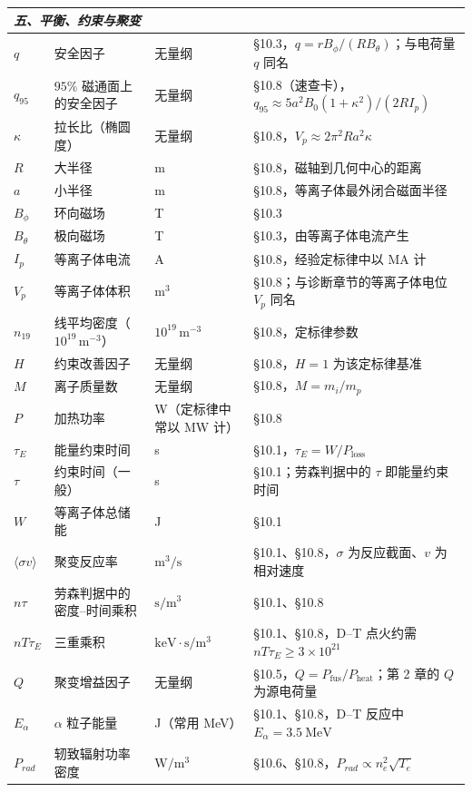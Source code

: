 \documentclass[12pt,a4paper,openany,oneside]{book}
\begin{document}
{\begin{longtable}{@{}p{1.8cm}p{4.4cm}p{3.3cm}p{5.1cm}@{}}
\multicolumn{4}{l}{\textit{五、平衡、约束与聚变}} \\
\midrule
$q$ & 安全因子 & 无量纲 & \S 10.3，$q = rB_\phi/(RB_\theta)$；与电荷量 $q$ 同名 \\
$q_{95}$ & $95\%$ 磁通面上的安全因子 & 无量纲 & \S 10.8（速查卡），$q_{95}\approx 5a^2B_0(1+\kappa^2)/(2RI_p)$ \\
$\kappa$ & 拉长比（椭圆度） & 无量纲 & \S 10.8，$V_p \approx 2\pi^2Ra^2\kappa$ \\
$R$ & 大半径 & m & \S 10.8，磁轴到几何中心的距离 \\
$a$ & 小半径 & m & \S 10.8，等离子体最外闭合磁面半径 \\
$B_\phi$ & 环向磁场 & T & \S 10.3 \\
$B_\theta$ & 极向磁场 & T & \S 10.3，由等离子体电流产生 \\
$I_p$ & 等离子体电流 & A & \S 10.8，经验定标律中以 MA 计 \\
$V_p$ & 等离子体体积 & $\mathrm{m^3}$ & \S 10.8；与诊断章节的等离子体电位 $V_p$ 同名 \\
$n_{19}$ & 线平均密度（$10^{19}\,\mathrm{m^{-3}}$） & $10^{19}\,\mathrm{m^{-3}}$ & \S 10.8，定标律参数 \\
$H$ & 约束改善因子 & 无量纲 & \S 10.8，$H=1$ 为该定标律基准 \\
$M$ & 离子质量数 & 无量纲 & \S 10.8，$M = m_i/m_p$ \\
$P$ & 加热功率 & W（定标律中常以 MW 计） & \S 10.8 \\
$\tau_E$ & 能量约束时间 & s & \S 10.1，$\tau_E = W/P_{\text{loss}}$ \\
$\tau$ & 约束时间（一般） & s & \S 10.1；劳森判据中的 $\tau$ 即能量约束时间 \\
$W$ & 等离子体总储能 & J & \S 10.1 \\
$\langle\sigma v\rangle$ & 聚变反应率 & $\mathrm{m^3/s}$ & \S 10.1、\S 10.8，$\sigma$ 为反应截面、$v$ 为相对速度 \\
$n\tau$ & 劳森判据中的密度--时间乘积 & $\mathrm{s/m^3}$ & \S 10.1、\S 10.8 \\
$nT\tau_E$ & 三重乘积 & $\mathrm{keV\cdot s/m^3}$ & \S 10.1、\S 10.8，D--T 点火约需 $nT\tau_E \geq 3\times10^{21}$ \\
$Q$ & 聚变增益因子 & 无量纲 & \S 10.5，$Q = P_{\text{fus}}/P_{\text{heat}}$；第 2 章的 $Q$ 为源电荷量 \\
$E_\alpha$ & $\alpha$ 粒子能量 & J（常用 MeV） & \S 10.1、\S 10.8，D--T 反应中 $E_\alpha = 3.5\ \mathrm{MeV}$ \\
$P_{rad}$ & 轫致辐射功率密度 & $\mathrm{W/m^3}$ & \S 10.6、\S 10.8，$P_{rad} \propto n_e^2\sqrt{T_e}$ \\

\end{longtable}}
\end{document}
